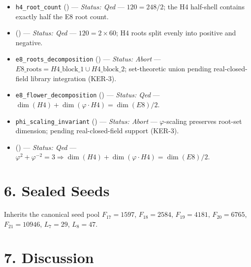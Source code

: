 \begin{itemize}
\tightlist
\item
  \texttt{h4\_root\_count}
  ()
  --- \emph{Status: Qed} --- \(120 = 248/2\); the
  H4 half-shell contains exactly half the E8 root
  count.
\item
  ()
  --- \emph{Status: Qed} ---
  \(120 = 2 \times 60\); H4 roots split evenly
  into positive and negative.
\item
  \texttt{e8\_roots\_decomposition}
  ()
  --- \emph{Status: Abort} ---
  \(E8\_\mathrm{roots} = H4\_\mathrm{block\_1} \cup H4\_\mathrm{block\_2}\);
  set-theoretic union pending real-closed-field
  library integration (KER-3).
\item
  \texttt{e8\_flower\_decomposition}
  ()
  --- \emph{Status: Qed} ---
  \(\dim(H4) + \dim(\varphi \cdot H4) = \dim(E8)/2\).
\item
  \texttt{phi\_scaling\_invariant}
  ()
  --- \emph{Status: Abort} --- \(\varphi\)-scaling
  preserves root-set dimension; pending
  real-closed-field support (KER-3).
\item
  ()
  --- \emph{Status: Qed} ---
  \(\varphi^2 + \varphi^{-2} = 3 \Rightarrow \dim(H4) + \dim(\varphi \cdot H4) = \dim(E8)/2\).
\end{itemize}

\section{6. Sealed Seeds}\label{fa_07:sealed-seeds}

Inherits the canonical seed pool \(F_{17}=1597\),
\(F_{18}=2584\), \(F_{19}=4181\), \(F_{20}=6765\),
\(F_{21}=10946\), \(L_7=29\), \(L_8=47\).

\section{7. Discussion}\label{fa_07:discussion}

